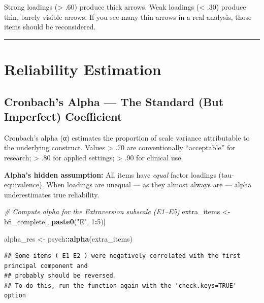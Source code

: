 \documentclass[
]{article}
\newenvironment{Shaded}{\begin{snugshade}}{\end{snugshade}}
\newcommand{\CommentTok}[1]{\textcolor[rgb]{0.56,0.35,0.01}{\textit{#1}}}
\newcommand{\DecValTok}[1]{\textcolor[rgb]{0.00,0.00,0.81}{#1}}
\newcommand{\FunctionTok}[1]{\textcolor[rgb]{0.13,0.29,0.53}{\textbf{#1}}}
\newcommand{\NormalTok}[1]{#1}
\newcommand{\OtherTok}[1]{\textcolor[rgb]{0.56,0.35,0.01}{#1}}
\newcommand{\SpecialCharTok}[1]{\textcolor[rgb]{0.81,0.36,0.00}{\textbf{#1}}}
\newcommand{\StringTok}[1]{\textcolor[rgb]{0.31,0.60,0.02}{#1}}
\begin{document}
Strong loadings (\textgreater{} .60) produce thick arrows. Weak loadings
(\textless{} .30) produce thin, barely visible arrows. If you see many
thin arrows in a real analysis, those items should be reconsidered.

\begin{center}\rule{0.5\linewidth}{0.5pt}\end{center}

\section{Reliability Estimation}\label{reliability-estimation}

\subsection{Cronbach's Alpha --- The Standard (But Imperfect)
Coefficient}\label{cronbachs-alpha-the-standard-but-imperfect-coefficient}

Cronbach's alpha (α) estimates the proportion of scale variance
attributable to the underlying construct. Values \textgreater{} .70 are
conventionally ``acceptable'' for research; \textgreater{} .80 for
applied settings; \textgreater{} .90 for clinical use.

\textbf{Alpha's hidden assumption:} All items have \emph{equal} factor
loadings (tau-equivalence). When loadings are unequal --- as they almost
always are --- alpha underestimates true reliability.

\begin{Shaded}
\begin{Highlighting}[]
\CommentTok{\# Compute alpha for the Extraversion subscale (E1–E5)}
\NormalTok{extra\_items }\OtherTok{\textless{}{-}}\NormalTok{ bfi\_complete[, }\FunctionTok{paste0}\NormalTok{(}\StringTok{"E"}\NormalTok{, }\DecValTok{1}\SpecialCharTok{:}\DecValTok{5}\NormalTok{)]}

\NormalTok{alpha\_res }\OtherTok{\textless{}{-}}\NormalTok{ psych}\SpecialCharTok{::}\FunctionTok{alpha}\NormalTok{(extra\_items)}
\end{Highlighting}
\end{Shaded}

\begin{verbatim}
## Some items ( E1 E2 ) were negatively correlated with the first principal component and 
## probably should be reversed.  
## To do this, run the function again with the 'check.keys=TRUE' option
\end{verbatim}
\end{document}
